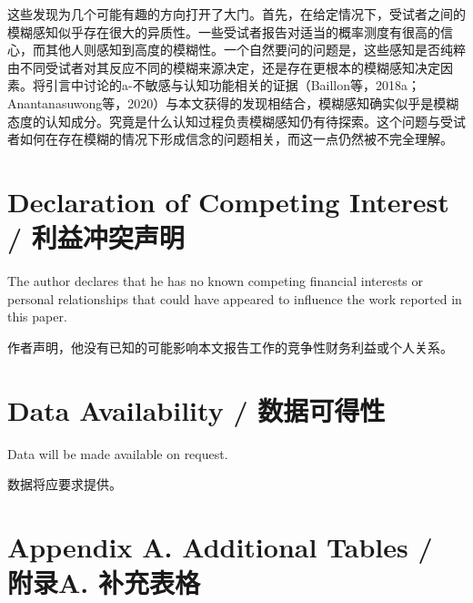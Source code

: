 \documentclass[12pt,a4paper]{article}
\newenvironment{original}
  {\par\medskip\noindent\color{black}\ignorespaces}
  {\par\medskip}
\newenvironment{translation}
  {\par\noindent\color{transblue}\ignorespaces}
  {\par\medskip\medskip}
\begin{document}
\begin{translation}
这些发现为几个可能有趣的方向打开了大门。首先，在给定情况下，受试者之间的模糊感知似乎存在很大的异质性。一些受试者报告对适当的概率测度有很高的信心，而其他人则感知到高度的模糊性。一个自然要问的问题是，这些感知是否纯粹由不同受试者对其反应不同的模糊来源决定，还是存在更根本的模糊感知决定因素。将引言中讨论的a-不敏感与认知功能相关的证据（Baillon等，2018a；Anantanasuwong等，2020）与本文获得的发现相结合，模糊感知确实似乎是模糊态度的认知成分。究竟是什么认知过程负责模糊感知仍有待探索。这个问题与受试者如何在存在模糊的情况下形成信念的问题相关，而这一点仍然被不完全理解。
\end{translation}

\newpage
\section*{Declaration of Competing Interest / 利益冲突声明}

\begin{original}
The author declares that he has no known competing financial interests or personal relationships that could have appeared to influence the work reported in this paper.
\end{original}

\begin{translation}
作者声明，他没有已知的可能影响本文报告工作的竞争性财务利益或个人关系。
\end{translation}

\section*{Data Availability / 数据可得性}

\begin{original}
Data will be made available on request.
\end{original}

\begin{translation}
数据将应要求提供。
\end{translation}

\newpage
\section*{Appendix A. Additional Tables / 附录A. 补充表格}
\end{document}
